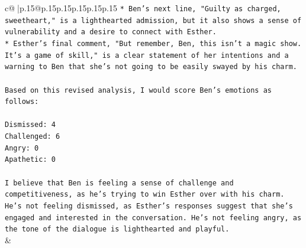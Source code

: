 \documentclass{article}
\begin{document}
{\begin{supertabular}{c@{$\;$}|p{.15\linewidth}@{}p{.15\linewidth}p{.15\linewidth}p{.15\linewidth}p{.15\linewidth}p{.15\linewidth}}
{{{\texttt{* Ben's next line, "Guilty as charged, sweetheart," is a lighthearted admission, but it also shows a sense of vulnerability and a desire to connect with Esther.} \\
\texttt{* Esther's final comment, "But remember, Ben, this isn't a magic show. It's a game of skill," is a clear statement of her intentions and a warning to Ben that she's not going to be easily swayed by his charm.} \\
\\ 
\texttt{Based on this revised analysis, I would score Ben's emotions as follows:} \\
\\ 
\texttt{Dismissed: 4} \\
\texttt{Challenged: 6} \\
\texttt{Angry: 0} \\
\texttt{Apathetic: 0} \\
\\ 
\texttt{I believe that Ben is feeling a sense of challenge and competitiveness, as he's trying to win Esther over with his charm. He's not feeling dismissed, as Esther's responses suggest that she's engaged and interested in the conversation. He's not feeling angry, as the tone of the dialogue is lighthearted and playful.} \\
            }
        }
    }
    & \\ \\

\end{supertabular}
}
\end{document}
